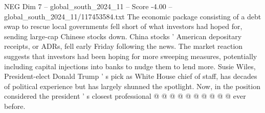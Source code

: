 \begin{textsample}{NEG Dim 7 – global\_south\_2024\_11 – Score -4.00 – global\_south\_2024\_11/117453584.txt}
The economic package consisting of a debt swap to rescue local governments fell short of what investors had hoped for, sending large-cap Chinese stocks down.
China stocks ' American depositary receipts, or ADRs, fell early Friday following the news.
The market reaction suggests that investors had been hoping for more sweeping measures, potentially including capital injections into banks to nudge them to lend more.
Susie Wiles, President-elect Donald Trump ' s pick as White House chief of staff, has decades of political experience but has largely shunned the spotlight.
Now, in the position considered the president ' s closest professional @ @ @ @ @ @ @ @ @ @ ever before.

\end{textsample}
